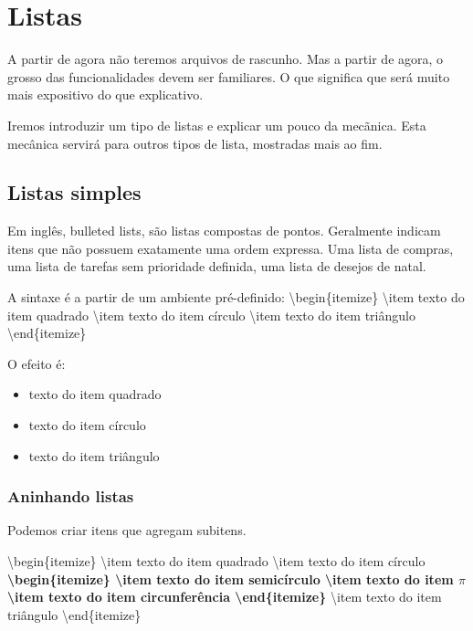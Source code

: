 \chapter{Listas}
A partir de agora não teremos arquivos de rascunho.
Mas a partir de agora, o grosso das funcionalidades devem ser familiares.
O que significa que será muito mais expositivo do que explicativo.

Iremos introduzir um tipo de listas e explicar um pouco da mecãnica.
Esta mecânica servirá para outros tipos de lista, mostradas mais ao fim.

\section{Listas simples}
Em inglês, bulleted lists, são listas compostas de pontos.
Geralmente indicam itens que não possuem exatamente uma ordem expressa.
Uma lista de compras, uma lista de tarefas sem prioridade definida,
uma lista de desejos de natal.

A sintaxe é a partir de um ambiente pré-definido:\newline
\textbackslash begin\{itemize\}\newline
\indent \textbackslash item texto do item quadrado\newline
\indent \textbackslash item texto do item círculo\newline
\indent \textbackslash item texto do item triângulo\newline
\textbackslash end\{itemize\}\newline

O efeito é:
\begin{itemize}
	\item texto do item quadrado
	\item texto do item círculo
	\item texto do item triângulo
\end{itemize}

\subsection{Aninhando listas}
Podemos criar itens que agregam subitens.

\noindent\textbackslash begin\{itemize\}\newline
\textbackslash item texto do item quadrado\newline
\textbackslash item texto do item círculo\newline
\textbf{
\textbackslash begin\{itemize\}\newline
\textbackslash item texto do item semicírculo\newline
\textbackslash item texto do item $\pi$\newline
\textbackslash item texto do item circunferência\newline
\textbackslash end\{itemize\}\newline
}
\textbackslash item texto do item triângulo\newline
\textbackslash end\{itemize\}\newline

